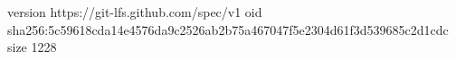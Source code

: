 version https://git-lfs.github.com/spec/v1
oid sha256:5c59618cda14e4576da9c2526ab2b75a467047f5e2304d61f3d539685c2d1cdc
size 1228
